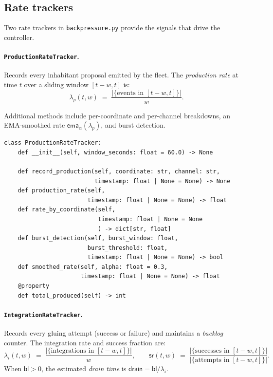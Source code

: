\documentclass[11pt]{article}
\providecommand{\prodrate}{\lambda_p}              %
\providecommand{\intrate}{\lambda_i}               %
\providecommand{\backlog}{\mathsf{bl}}             %
\providecommand{\draintime}{\mathsf{drain}}        %
\providecommand{\ema}{\mathsf{ema}}                %
\providecommand{\ProdPY}{\texttt{ProductionRateTracker}}
\providecommand{\IntPY}{\texttt{IntegrationRateTracker}}
\begin{document}
\subsection{Rate trackers}

Two rate trackers in \texttt{backpressure.py} provide the signals that
drive the controller.

\paragraph{\ProdPY{}.}
Records every inhabitant proposal emitted by the fleet.  The
\emph{production rate} at time $t$ over a sliding window $[t - w, t]$ is:
\[
  \prodrate(t, w)
  \;=\;
  \frac{|\{\text{events in }[t-w,t]\}|}{w}.
\]

Additional methods include per-coordinate and per-channel breakdowns, an
EMA-smoothed rate $\ema_\alpha(\prodrate)$, and burst detection.

\begin{lstlisting}[style=jugeo-python, caption={\ProdPY{} interface.}]
class ProductionRateTracker:
    def __init__(self, window_seconds: float = 60.0) -> None

    def record_production(self, coordinate: str, channel: str,
                          timestamp: float | None = None) -> None
    def production_rate(self,
                        timestamp: float | None = None) -> float
    def rate_by_coordinate(self,
                           timestamp: float | None = None
                           ) -> dict[str, float]
    def burst_detection(self, burst_window: float,
                        burst_threshold: float,
                        timestamp: float | None = None) -> bool
    def smoothed_rate(self, alpha: float = 0.3,
                      timestamp: float | None = None) -> float
    @property
    def total_produced(self) -> int
\end{lstlisting}

\paragraph{\IntPY{}.}
Records every gluing attempt (success or failure) and maintains a
\emph{backlog} counter.  The integration rate and success fraction are:
\[
  \intrate(t, w)
  \;=\;
  \frac{|\{\text{integrations in }[t-w,t]\}|}{w},
  \qquad
  \mathsf{sr}(t, w)
  \;=\;
  \frac{|\{\text{successes in }[t-w,t]\}|}{|\{\text{attempts in }[t-w,t]\}|}.
\]
When $\backlog > 0$, the estimated \emph{drain time} is
$\draintime = \backlog / \intrate$.
\end{document}
